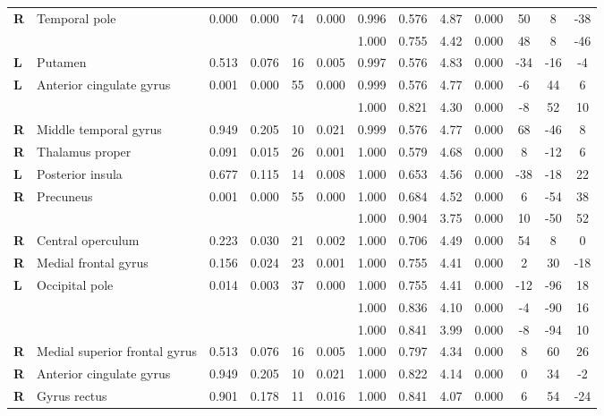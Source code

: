 \begin{landscape}
\begin{fullwidth}
\begin{table}[!ht]
\begin{tabular}{ll|cccc|cccc|ccc}
        \textbf{R} & Temporal pole & 0.000 & 0.000 & 74 & 0.000 & 0.996 & 0.576 & 4.87 & 0.000 & 50 & 8 & -38 \\
        & & & & & & 1.000 & 0.755 & 4.42 & 0.000 & 48 & 8 & -46 \\
        \textbf{L} & Putamen & 0.513 & 0.076 & 16 & 0.005 & 0.997 & 0.576 & 4.83 & 0.000 & -34 & -16 & -4 \\
        \textbf{L} & Anterior cingulate gyrus & 0.001 & 0.000 & 55 & 0.000 & 0.999 & 0.576 & 4.77 & 0.000 & -6 & 44 & 6 \\
        & & & & & & 1.000 & 0.821 & 4.30 & 0.000 & -8 & 52 & 10 \\
        \textbf{R} & Middle temporal gyrus & 0.949 & 0.205 & 10 & 0.021 & 0.999 & 0.576 & 4.77 & 0.000 & 68 & -46 & 8 \\
        \textbf{R} & Thalamus proper & 0.091 & 0.015 & 26 & 0.001 & 1.000 & 0.579 & 4.68 & 0.000 & 8 & -12 & 6 \\
        \textbf{L} & Posterior insula & 0.677 & 0.115 & 14 & 0.008 & 1.000 & 0.653 & 4.56 & 0.000 & -38 & -18 & 22 \\
        \textbf{R} & Precuneus & 0.001 & 0.000 & 55 & 0.000 & 1.000 & 0.684 & 4.52 & 0.000 & 6 & -54 & 38 \\
        & & & & & & 1.000 & 0.904 & 3.75 & 0.000 & 10 & -50 & 52 \\
        \textbf{R} & Central operculum & 0.223 & 0.030 & 21 & 0.002 & 1.000 & 0.706 & 4.49 & 0.000 & 54 & 8 & 0 \\
        \textbf{R} & Medial frontal gyrus & 0.156 & 0.024 & 23 & 0.001 & 1.000 & 0.755 & 4.41 & 0.000 & 2 & 30 & -18 \\
        \textbf{L} & Occipital pole & 0.014 & 0.003 & 37 & 0.000 & 1.000 & 0.755 & 4.41 & 0.000 & -12 & -96 & 18 \\
        & & & & & & 1.000 & 0.836 & 4.10 & 0.000 & -4 & -90 & 16 \\
        & & & & & & 1.000 & 0.841 & 3.99 & 0.000 & -8 & -94 & 10 \\
        \textbf{R} & Medial superior frontal gyrus & 0.513 & 0.076 & 16 & 0.005 & 1.000 & 0.797 & 4.34 & 0.000 & 8 & 60 & 26 \\
        \textbf{R} & Anterior cingulate gyrus & 0.949 & 0.205 & 10 & 0.021 & 1.000 & 0.822 & 4.14 & 0.000 & 0 & 34 & -2 \\
        \textbf{R} & Gyrus rectus & 0.901 & 0.178 & 11 & 0.016 & 1.000 & 0.841 & 4.07 & 0.000 & 6 & 54 & -24 \\

\end{tabular}
\end{table}
\end{fullwidth}
\end{landscape}
